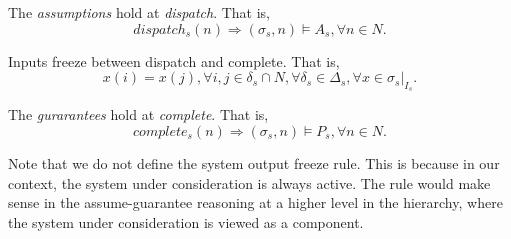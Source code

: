 The \emph{assumptions} hold at \emph{dispatch}. That is,
\begin{equation} 
\label{eqn:assumption}
	dispatch_s(n) \Rightarrow (\sigma_s, n) \models A_s, \forall n\in N.
\end{equation}

Inputs freeze between dispatch and complete. That is,
\begin{equation} 
\label{eqn:inputfreeze}
	x(i) = x(j), \forall i,j\in \delta_s \cap N, \forall \delta_s \in \Delta_s, \forall x \in \sigma_s|_{I_s}.
\end{equation}

The \emph{gurarantees} hold at \emph{complete}. That is,
\begin{equation} 
\label{eqn:guarantee}
	complete_s(n) \Rightarrow (\sigma_s, n) \models P_s, \forall n\in N.
\end{equation}

Note that we do not define the system output freeze rule. This is because in our context, the system under consideration is always active. The rule would make sense in the assume-guarantee reasoning at a higher level in the hierarchy, where the system under consideration is viewed as a component.
